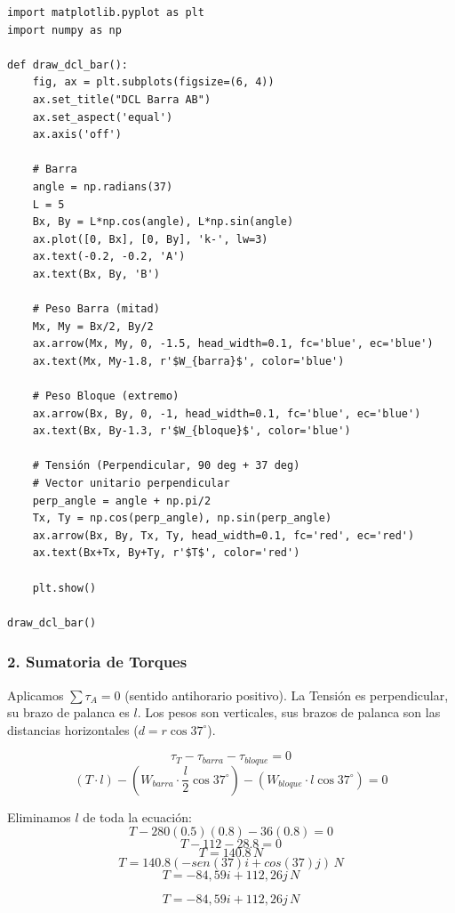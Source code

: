 \documentclass[12pt, a4paper]{article}
\begin{document}
\begin{lstlisting}
import matplotlib.pyplot as plt
import numpy as np

def draw_dcl_bar():
    fig, ax = plt.subplots(figsize=(6, 4))
    ax.set_title("DCL Barra AB")
    ax.set_aspect('equal')
    ax.axis('off')
    
    # Barra
    angle = np.radians(37)
    L = 5
    Bx, By = L*np.cos(angle), L*np.sin(angle)
    ax.plot([0, Bx], [0, By], 'k-', lw=3)
    ax.text(-0.2, -0.2, 'A')
    ax.text(Bx, By, 'B')
    
    # Peso Barra (mitad)
    Mx, My = Bx/2, By/2
    ax.arrow(Mx, My, 0, -1.5, head_width=0.1, fc='blue', ec='blue')
    ax.text(Mx, My-1.8, r'$W_{barra}$', color='blue')
    
    # Peso Bloque (extremo)
    ax.arrow(Bx, By, 0, -1, head_width=0.1, fc='blue', ec='blue')
    ax.text(Bx, By-1.3, r'$W_{bloque}$', color='blue')
    
    # Tensión (Perpendicular, 90 deg + 37 deg)
    # Vector unitario perpendicular
    perp_angle = angle + np.pi/2
    Tx, Ty = np.cos(perp_angle), np.sin(perp_angle)
    ax.arrow(Bx, By, Tx, Ty, head_width=0.1, fc='red', ec='red')
    ax.text(Bx+Tx, By+Ty, r'$T$', color='red')
    
    plt.show()

draw_dcl_bar()
\end{lstlisting}

\subsubsection*{2. Sumatoria de Torques}
Aplicamos $\sum \tau_A = 0$ (sentido antihorario positivo).
La Tensión es perpendicular, su brazo de palanca es $l$.
Los pesos son verticales, sus brazos de palanca son las distancias horizontales ($d = r \cos 37^\circ$).

$$ \tau_T - \tau_{barra} - \tau_{bloque} = 0 $$
$$ (T \cdot l) - (W_{barra} \cdot \frac{l}{2} \cos 37^\circ) - (W_{bloque} \cdot l \cos 37^\circ) = 0 $$

Eliminamos $l$ de toda la ecuación:
$$ T - 280(0.5)(0.8) - 36(0.8) = 0 $$
$$ T - 112 - 28.8 = 0 $$
$$ T = 140.8 \, \si{N} $$
$$ T = 140.8 (-sen (37) i + cos (37)j) \, \si{N} $$
$$ T = -84,59 i + 112,26j \, \si{N} $$

\begin{tcolorbox}[colback=green!5!white, colframe=green!50!black, title=Respuesta]
$$ T = -84,59 i + 112,26j \, \si{N} $$
\end{tcolorbox}
\end{document}
